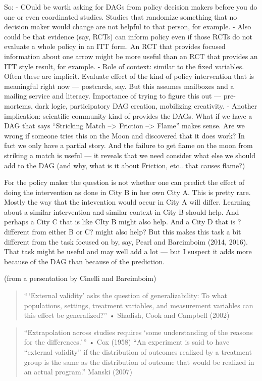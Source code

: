 \documentclass[
]{article}
\begin{document}
So: - COuld be worth asking for DAGs from policy decision makers before
you do one or even coordinated studies. Studies that randomize something
that no decision maker would change are not helpful to that person, for
example. - Also could be that evidence (say, RCTs) can inform policy
even if those RCTs do not evaluate a whole policy in an ITT form. An RCT
that provides focused information about one arrow might be more useful
than an RCT that provides an ITT style result, for example. - Role of
context: similar to the fixed variables. Often these are implicit.
Evaluate effect of the kind of policy intervention that is meaningful
right now --- postcards, say. But this assumes mailboxes and a mailing
service and literacy. Importance of trying to figure this out ---
pre-mortems, dark logic, participatory DAG creation, mobilizing
creativity. - Another implication: scientific community kind of provides
the DAGs. What if we have a DAG that says ``Stricking Match
--\textgreater{} Friction --\textgreater{} Flame'' makes sense. Are we
wrong if someone tries this on the Moon and discovered that it does
work? In fact we only have a partial story. And the failure to get flame
on the moon from striking a match is useful --- it reveals that we need
consider what else we should add to the DAG (and why, what is it about
Friction, etc.. that causes flame?)

For the policy maker the question is not whether one can predict the
effect of doing the intervention as done in City B in her own City A.
This is pretty rare. Mostly the way that the intevention would occur in
City A will differ. Learning about a similar intervention and similar
context in City B should help. And perhaps a City C that is like CIty B
might also help. And a City D that is ?different from either B or C?
might also help? But this makes this task a bit different from the task
focused on by, say, Pearl and Bareimboim (2014, 2016). That task might
be useful and may well add a lot --- but I suspect it adds more because
of the DAG than because of the prediction.

(from a persentation by Cinelli and Bareimboim)

\begin{quote}
``\,`External validity' asks the question of generalizability: To what
populations, settings, treatment variables, and measurement variables
can this effect be generalized?'' • Shadish, Cook and Campbell (2002)
\end{quote}

\begin{quote}
``Extrapolation across studies requires `some understanding of the
reasons for the differences.'\,'' • Cox (1958) ``An experiment is said
to have ``external validity'' if the distribution of outcomes realized
by a treatment group is the same as the distribution of outcome that
would be realized in an actual program.'' Manski (2007)
\end{quote}
\end{document}
